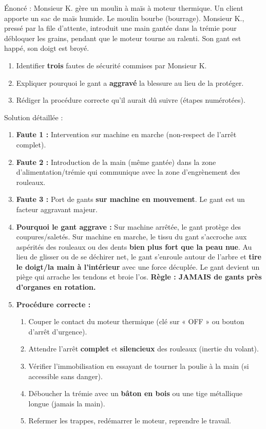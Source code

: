 \documentclass[11pt]{article}
\begin{document}
\begin{exoresolu}
{Énoncé :}
Monsieur K. gère un moulin à maïs à moteur thermique. Un client apporte un sac de maïs humide. Le moulin bourbe (bourrage). Monsieur K., pressé par la file d'attente, introduit une main gantée dans la trémie pour débloquer les grains, pendant que le moteur tourne au ralenti. Son gant est happé, son doigt est broyé.
\begin{enumerate}
    \item Identifier \textbf{trois} fautes de sécurité commises par Monsieur K.
    \item Expliquer pourquoi le gant a \textbf{aggravé} la blessure au lieu de la protéger.
    \item Rédiger la procédure correcte qu'il aurait dû suivre (étapes numérotées).
\end{enumerate}
\tcblower
{Solution détaillée :}
\begin{enumerate}
    \item \textbf{Faute 1 :} Intervention sur machine en marche (non-respect de l'arrêt complet).
    \item \textbf{Faute 2 :} Introduction de la main (même gantée) dans la zone d'alimentation/trémie qui communique avec la zone d'engrènement des rouleaux.
    \item \textbf{Faute 3 :} Port de gants \textbf{sur machine en mouvement}. Le gant est un facteur aggravant majeur.
    \item \textbf{Pourquoi le gant aggrave :} Sur machine arrêtée, le gant protège des coupures/saletés. Sur machine en marche, le tissu du gant s'accroche aux aspérités des rouleaux ou des dents \textbf{bien plus fort que la peau nue}. Au lieu de glisser ou de se déchirer net, le gant s'enroule autour de l'arbre et \textbf{tire le doigt/la main à l'intérieur} avec une force décuplée. Le gant devient un piège qui arrache les tendons et broie l'os. \textbf{Règle : JAMAIS de gants près d'organes en rotation.}
    \item \textbf{Procédure correcte :}
    \begin{enumerate}
        \item Couper le contact du moteur thermique (clé sur « OFF » ou bouton d'arrêt d'urgence).
        \item Attendre l'arrêt \textbf{complet} et \textbf{silencieux} des rouleaux (inertie du volant).
        \item Vérifier l'immobilisation en essayant de tourner la poulie à la main (si accessible sans danger).
        \item Déboucher la trémie avec un \textbf{bâton en bois} ou une tige métallique longue (jamais la main).
        \item Refermer les trappes, redémarrer le moteur, reprendre le travail.
    \end{enumerate}
\end{enumerate}
\end{exoresolu}
\end{document}

